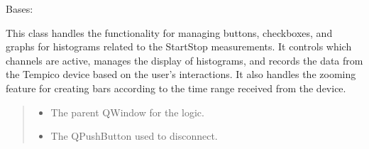 \documentclass[letterpaper,10pt,english]{sphinxmanual}
\begin{document}
\begin{fulllineitems}
\label{\detokenize{StartStopHist:StartStopHist.StartStopLogic}}
\pysigstartsignatures
{}
\pysigstopsignatures
\sphinxAtStartPar
Bases: 

\sphinxAtStartPar
This class handles the functionality for managing buttons, checkboxes, and graphs for histograms related to the Start\sphinxhyphen{}Stop measurements. 
It controls which channels are active, manages the display of histograms, and records the data from the Tempico device based on the user’s interactions. 
It also handles the zooming feature for creating bars according to the time range received from the device.
\begin{quote}\begin{description}
\begin{itemize}
\item {} 
\sphinxAtStartPar
{} \textendash{} The parent QWindow for the logic.

\item {} 
\sphinxAtStartPar
{} \textendash{} The QPushButton used to disconnect.


\end{itemize}
\end{description}
\end{quote}
\end{fulllineitems}
\end{document}
